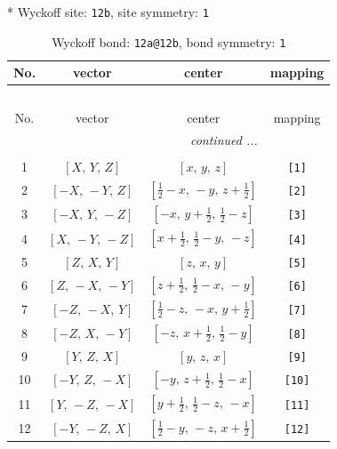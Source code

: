 \documentclass[fleqn,8pt]{jsarticle}
\begin{document}
* Wyckoff site: {\tt 12b}, site symmetry: {\tt 1}
\renewcommand{\arraystretch}{1.2}
\begin{longtable}{cccc}
\caption{Wyckoff bond: {\tt 12a@12b}, bond symmetry: {\tt 1}}
 \\
 \hline \hline
No. & vector & center & mapping \\ \hline \endfirsthead

\multicolumn{3}{l}{\tablename\ \thetable{}} \\
 \hline \hline
No. & vector & center & mapping \\ \hline \endhead

 \hline \hline
\multicolumn{3}{r}{\footnotesize\it continued ...} \\ \endfoot

 \hline \hline
\multicolumn{3}{r}{} \\ \endlastfoot

1 & $\left[ X,\, Y,\, Z \right]$ & $\left[ x,\, y,\, z \right]$ & {\tt [1]} \\ \hline
2 & $\left[ - X,\, - Y,\, Z \right]$ & $\left[ \frac{1}{2} - x,\, - y,\, z + \frac{1}{2} \right]$ & {\tt [2]} \\ \hline
3 & $\left[ - X,\, Y,\, - Z \right]$ & $\left[ - x,\, y + \frac{1}{2},\, \frac{1}{2} - z \right]$ & {\tt [3]} \\ \hline
4 & $\left[ X,\, - Y,\, - Z \right]$ & $\left[ x + \frac{1}{2},\, \frac{1}{2} - y,\, - z \right]$ & {\tt [4]} \\ \hline
5 & $\left[ Z,\, X,\, Y \right]$ & $\left[ z,\, x,\, y \right]$ & {\tt [5]} \\ \hline
6 & $\left[ Z,\, - X,\, - Y \right]$ & $\left[ z + \frac{1}{2},\, \frac{1}{2} - x,\, - y \right]$ & {\tt [6]} \\ \hline
7 & $\left[ - Z,\, - X,\, Y \right]$ & $\left[ \frac{1}{2} - z,\, - x,\, y + \frac{1}{2} \right]$ & {\tt [7]} \\ \hline
8 & $\left[ - Z,\, X,\, - Y \right]$ & $\left[ - z,\, x + \frac{1}{2},\, \frac{1}{2} - y \right]$ & {\tt [8]} \\ \hline
9 & $\left[ Y,\, Z,\, X \right]$ & $\left[ y,\, z,\, x \right]$ & {\tt [9]} \\ \hline
10 & $\left[ - Y,\, Z,\, - X \right]$ & $\left[ - y,\, z + \frac{1}{2},\, \frac{1}{2} - x \right]$ & {\tt [10]} \\ \hline
11 & $\left[ Y,\, - Z,\, - X \right]$ & $\left[ y + \frac{1}{2},\, \frac{1}{2} - z,\, - x \right]$ & {\tt [11]} \\ \hline
12 & $\left[ - Y,\, - Z,\, X \right]$ & $\left[ \frac{1}{2} - y,\, - z,\, x + \frac{1}{2} \right]$ & {\tt [12]} \\
\end{longtable}
\end{document}

